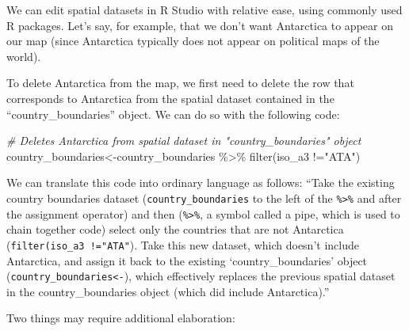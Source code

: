 \documentclass[
]{article}
\newenvironment{Shaded}{\begin{snugshade}}{\end{snugshade}}
\newcommand{\CommentTok}[1]{\textcolor[rgb]{0.56,0.35,0.01}{\textit{#1}}}
\newcommand{\FunctionTok}[1]{\textcolor[rgb]{0.00,0.00,0.00}{#1}}
\newcommand{\NormalTok}[1]{#1}
\newcommand{\OtherTok}[1]{\textcolor[rgb]{0.56,0.35,0.01}{#1}}
\newcommand{\SpecialCharTok}[1]{\textcolor[rgb]{0.00,0.00,0.00}{#1}}
\newcommand{\StringTok}[1]{\textcolor[rgb]{0.31,0.60,0.02}{#1}}
\begin{document}
We can edit spatial datasets in R Studio with relative ease, using commonly used R packages. Let's say, for example, that we don't want Antarctica to appear on our map (since Antarctica typically does not appear on political maps of the world).

To delete Antarctica from the map, we first need to delete the row that corresponds to Antarctica from the spatial dataset contained in the ``country\_boundaries'' object. We can do so with the following code:

\begin{Shaded}
\begin{Highlighting}[]
\CommentTok{\# Deletes Antarctica from spatial dataset in "country\_boundaries" object}
\NormalTok{country\_boundaries}\OtherTok{\textless{}{-}}\NormalTok{country\_boundaries }\SpecialCharTok{\%\textgreater{}\%} \FunctionTok{filter}\NormalTok{(iso\_a3 }\SpecialCharTok{!=}\StringTok{"ATA"}\NormalTok{)}
\end{Highlighting}
\end{Shaded}

We can translate this code into ordinary language as follows: ``Take the existing country boundaries dataset (\texttt{country\_boundaries} to the left of the \texttt{\%\textgreater{}\%} and after the assignment operator) and then (\texttt{\%\textgreater{}\%}, a symbol called a pipe, which is used to chain together code) select only the countries that are not Antarctica (\texttt{filter(iso\_a3\ !="ATA"}). Take this new dataset, which doesn't include Antarctica, and assign it back to the existing `country\_boundaries' object (\texttt{country\_boundaries\textless{}-}), which effectively replaces the previous spatial dataset in the country\_boundaries object (which did include Antarctica).''

Two things may require additional elaboration:
\end{document}
